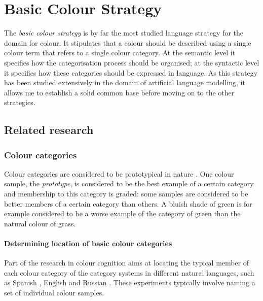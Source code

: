 \chapter{Basic Colour Strategy}
\label{s:basic-strategy}
\label{s:first-strategy}

The \emph{basic colour strategy} is by far the most studied language
strategy for the domain for colour. It stipulates that a colour should
be described using a single colour term that refers to a single colour
category. At the semantic level it specifies how the categorisation
process should be organised; at the syntactic level it specifies how
these categories should be expressed in language. As this strategy has
been studied extensively in the domain of artificial language
modelling, it allows me to establish a solid common base before moving
on to the other strategies.

\section{Related research}

\subsection{Colour categories}

Colour categories are considered to be
prototypical in nature \citep{rosch73natural}. One colour sample, the
\emph{prototype}, is considered
to be the best example of a certain category and membership to this
category is graded: some samples are considered to be better members
of a certain category than others. A bluish shade of green is for
example considered to be a worse example of the category of green than
the natural colour of grass.

\subsubsection*{Determining location of basic colour categories}

Part of the research in colour cognition aims at locating the typical
member of each colour category of the category systems in different
natural languages, such as Spanish \citep{lillo07locating}, English
\citep{boynton87locating, sturges95location} and Russian
\citep{safuanova07russian}. These experiments typically involve naming
a set of individual colour samples.

